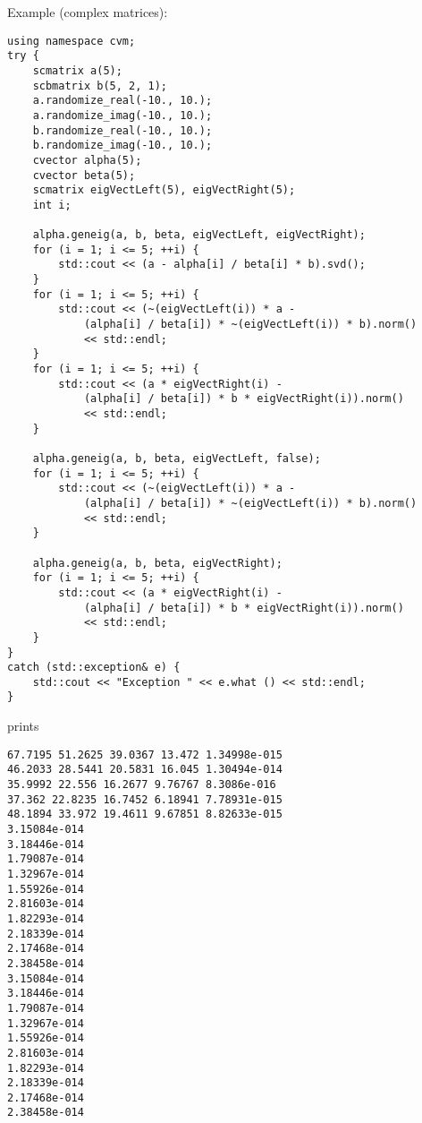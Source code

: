Example (complex matrices):
\begin{Verbatim}
using namespace cvm;
try {
    scmatrix a(5);
    scbmatrix b(5, 2, 1);
    a.randomize_real(-10., 10.);
    a.randomize_imag(-10., 10.);
    b.randomize_real(-10., 10.);
    b.randomize_imag(-10., 10.);
    cvector alpha(5);
    cvector beta(5);
    scmatrix eigVectLeft(5), eigVectRight(5);
    int i;

    alpha.geneig(a, b, beta, eigVectLeft, eigVectRight);
    for (i = 1; i <= 5; ++i) {
        std::cout << (a - alpha[i] / beta[i] * b).svd();
    }
    for (i = 1; i <= 5; ++i) {
        std::cout << (~(eigVectLeft(i)) * a -
            (alpha[i] / beta[i]) * ~(eigVectLeft(i)) * b).norm()
            << std::endl;
    }
    for (i = 1; i <= 5; ++i) {
        std::cout << (a * eigVectRight(i) -
            (alpha[i] / beta[i]) * b * eigVectRight(i)).norm()
            << std::endl;
    }

    alpha.geneig(a, b, beta, eigVectLeft, false);
    for (i = 1; i <= 5; ++i) {
        std::cout << (~(eigVectLeft(i)) * a -
            (alpha[i] / beta[i]) * ~(eigVectLeft(i)) * b).norm()
            << std::endl;
    }

    alpha.geneig(a, b, beta, eigVectRight);
    for (i = 1; i <= 5; ++i) {
        std::cout << (a * eigVectRight(i) -
            (alpha[i] / beta[i]) * b * eigVectRight(i)).norm()
            << std::endl;
    }
}
catch (std::exception& e) {
    std::cout << "Exception " << e.what () << std::endl;
}
\end{Verbatim}
prints
\begin{Verbatim}
67.7195 51.2625 39.0367 13.472 1.34998e-015
46.2033 28.5441 20.5831 16.045 1.30494e-014
35.9992 22.556 16.2677 9.76767 8.3086e-016
37.362 22.8235 16.7452 6.18941 7.78931e-015
48.1894 33.972 19.4611 9.67851 8.82633e-015
3.15084e-014
3.18446e-014
1.79087e-014
1.32967e-014
1.55926e-014
2.81603e-014
1.82293e-014
2.18339e-014
2.17468e-014
2.38458e-014
3.15084e-014
3.18446e-014
1.79087e-014
1.32967e-014
1.55926e-014
2.81603e-014
1.82293e-014
2.18339e-014
2.17468e-014
2.38458e-014
\end{Verbatim}
\newpage




